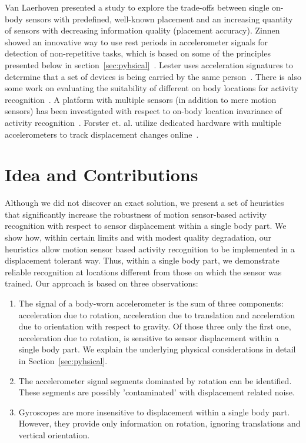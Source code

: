 Van Laerhoven presented a study to explore the trade-offs between 
single on-body sensors with predefined, well-known placement 
and an increasing quantity of sensors with decreasing information quality 
(placement accuracy)\cite{vanLaerhoven:2008p1442}.  
Zinnen showed an innovative way to use rest periods in accelerometer signals 
for detection of non-repetitive tasks,
which is based on some of the principles presented below in section~\ref{sec:pyhsical}~\cite{Zinnen:2008p631}. 
Lester uses acceleration signatures to 
determine that a set of devices is being
carried by the same person~\cite{Lester:2004p738}. 
There is also some work on evaluating
the suitability of different on body locations
for activity recognition~\cite{Maurer:2006p1533}. A platform with 
multiple sensors (in addition to mere motion sensors) has been investigated 
with respect to on-body location invariance of activity
recognition~\cite{Lester:2006p856}.
Forster et. al. utilize dedicated hardware with multiple accelerometers to track displacement changes online~\cite{Forster1,Forster2}.


\section{Idea and Contributions}
Although we did not discover an exact solution, 
we present a set of heuristics that significantly increase the robustness of motion
  sensor-based activity recognition with respect to sensor
  displacement within a single body part. We show how, within
  certain limits and with modest quality degradation, our heuristics  
  allow motion sensor based activity recognition to be implemented 
  in a displacement tolerant way. Thus,
  within a single body part, we demonstrate reliable recognition at
  locations different from those on which the sensor was trained. 
Our approach is based on three observations:
\begin{enumerate}
\item The signal of a body-worn accelerometer is the sum of three
  components: acceleration due to rotation,
  acceleration due to translation and acceleration due to orientation
  with respect to gravity. Of those three only the first one,
  acceleration due to rotation, is sensitive to sensor displacement
  within a single body part. We explain the underlying physical considerations 
in detail in Section~\ref{sec:pyhsical}.
\item The accelerometer signal segments dominated by rotation can be identified. 
  These segments are possibly 'contaminated' with displacement related noise.
\item Gyroscopes are more insensitive to displacement within a
  single body part. However, they provide only information on
  rotation, ignoring translations and vertical orientation.   
\end{enumerate}

